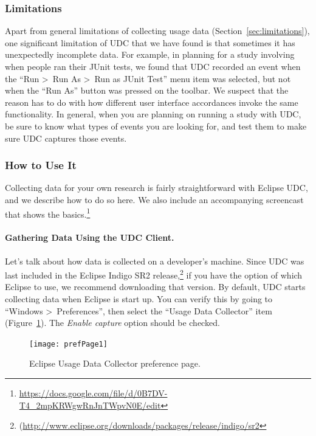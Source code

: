 \subsubsection{Limitations}

Apart from general limitations of collecting usage data (Section~\ref{sec:limitations}),
one significant limitation of UDC that we have found is that sometimes it has 
unexpectedly incomplete data.
For example, in planning for a study involving when people ran their JUnit tests,
we found that UDC recorded an event when the ``Run \textgreater~Run As \textgreater~Run as JUnit Test'' menu item was selected,
but not when the ``Run As'' button was pressed on the toolbar.
We suspect that the reason has to do with how different user interface accordances
invoke the same functionality.
In general, when you are planning on running a study with UDC, be sure to know what 
types of events you are looking for, and test them to make sure UDC captures those events.

\subsubsection{How to Use It}

Collecting data for your own research is fairly straightforward with Eclipse UDC,
and we describe how to do so here.
We also include an accompanying screencast that shows the 
basics.\footnote{\url{https://docs.google.com/file/d/0B7DV-T4_2mpKRWgwRnJnTWpvN0E/edit}}

\paragraph{Gathering Data Using the UDC Client.}

Let's talk about how data is collected on a developer's machine.
Since UDC was last included in the Eclipse Indigo SR2 
release,\footnote{(\url{http://www.eclipse.org/downloads/packages/release/indigo/sr2}}
if you have the option of which Eclipse to use, we recommend downloading
that version.
By default, UDC starts collecting data when Eclipse is start up. 
You can verify this by going to ``Windows \textgreater~Preferences'', then
select the ``Usage Data Collector'' item (Figure~\ref{fig:prefPage1}).
The \textit{Enable capture} option should be checked.

\begin{figure}
  \centering
  \texttt{[image: prefPage1]}
  \caption{Eclipse Usage Data Collector preference page.}\label{fig:prefPage1}
\end{figure}

